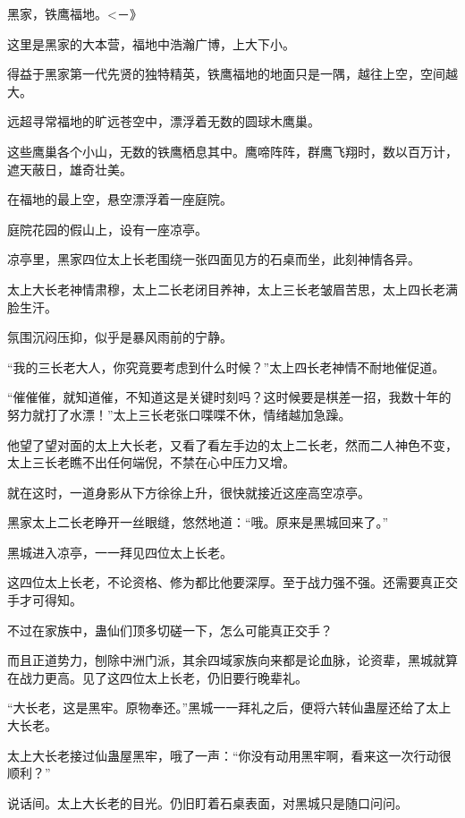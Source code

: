 
\begin{this_body}

黑家，铁鹰福地。<－》

这里是黑家的大本营，福地中浩瀚广博，上大下小。

得益于黑家第一代先贤的独特精英，铁鹰福地的地面只是一隅，越往上空，空间越大。

远超寻常福地的旷远苍空中，漂浮着无数的圆球木鹰巢。

这些鹰巢各个小山，无数的铁鹰栖息其中。鹰啼阵阵，群鹰飞翔时，数以百万计，遮天蔽日，雄奇壮美。

在福地的最上空，悬空漂浮着一座庭院。

庭院花园的假山上，设有一座凉亭。

凉亭里，黑家四位太上长老围绕一张四面见方的石桌而坐，此刻神情各异。

太上大长老神情肃穆，太上二长老闭目养神，太上三长老皱眉苦思，太上四长老满脸生汗。

氛围沉闷压抑，似乎是暴风雨前的宁静。

“我的三长老大人，你究竟要考虑到什么时候？”太上四长老神情不耐地催促道。

“催催催，就知道催，不知道这是关键时刻吗？这时候要是棋差一招，我数十年的努力就打了水漂！”太上三长老张口喋喋不休，情绪越加急躁。

他望了望对面的太上大长老，又看了看左手边的太上二长老，然而二人神色不变，太上三长老瞧不出任何端倪，不禁在心中压力又增。

就在这时，一道身影从下方徐徐上升，很快就接近这座高空凉亭。

黑家太上二长老睁开一丝眼缝，悠然地道：“哦。原来是黑城回来了。”

黑城进入凉亭，一一拜见四位太上长老。

这四位太上长老，不论资格、修为都比他要深厚。至于战力强不强。还需要真正交手才可得知。

不过在家族中，蛊仙们顶多切磋一下，怎么可能真正交手？

而且正道势力，刨除中洲门派，其余四域家族向来都是论血脉，论资辈，黑城就算在战力更高。见了这四位太上长老，仍旧要行晚辈礼。

“大长老，这是黑牢。原物奉还。”黑城一一拜礼之后，便将六转仙蛊屋还给了太上大长老。

太上大长老接过仙蛊屋黑牢，哦了一声：“你没有动用黑牢啊，看来这一次行动很顺利？”

说话间。太上大长老的目光。仍旧盯着石桌表面，对黑城只是随口问问。


\end{this_body}

